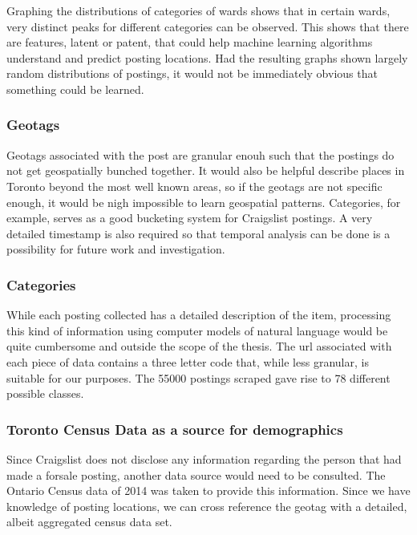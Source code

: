\documentclass[12pt]{article}
\begin{document}
Graphing the distributions of categories of wards shows that in certain wards, very distinct peaks for different categories can be observed. This shows that there are features, latent or patent, that could help machine learning algorithms understand and predict posting locations. Had the resulting graphs shown largely random distributions of postings, it would not be immediately obvious that something could be learned. 

\subsubsection{Geotags} %
Geotags associated with the post are granular enouh such that the postings do not get geospatially bunched together. It would also be helpful describe places in Toronto beyond the most well known areas, so if the geotags are not specific enough, it would be nigh impossible to learn geospatial patterns. Categories, for example, serves as a good bucketing system for Craigslist postings. A very detailed timestamp is also required so that temporal analysis can be done is a possibility for future work and investigation.

\subsubsection{Categories}
While each posting collected has a detailed description of the item, processing this kind of information using computer models of natural language would be quite cumbersome and outside the scope of the thesis. The url associated with each piece of data contains a three letter code that, while less granular, is suitable for our purposes. The 55000 postings scraped gave rise to 78 different possible classes. 


\subsubsection{Toronto Census Data as a source for demographics}
Since Craigslist does not disclose any information regarding the person that had made a forsale posting, another data source would need to be consulted. The Ontario Census data of 2014 was taken to provide this information. Since we have knowledge of posting locations, we can cross reference the geotag with a detailed, albeit aggregated census data set. 
\end{document}
